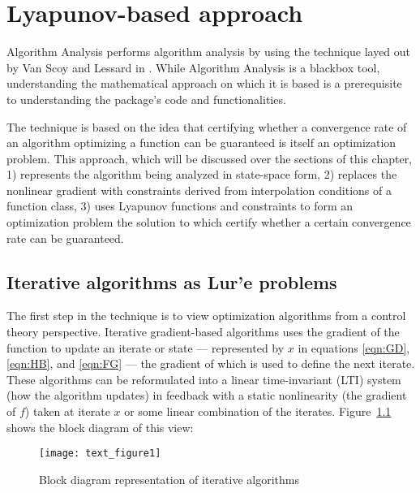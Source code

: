 \chapter{Lyapunov-based approach}\label{chapter:lyapunov}

Algorithm Analysis performs algorithm analysis by using the technique layed out by Van Scoy and Lessard in \cite{tutorial}. While Algorithm Analysis is a blackbox tool, understanding the mathematical approach on which it is based is a prerequisite to understanding the package's code and functionalities.

The technique is based on the idea that certifying whether a convergence rate of an algorithm optimizing a function can be guaranteed is itself an optimization problem. This approach, which will be discussed over the sections of this chapter, 1) represents the algorithm being analyzed in state-space form, 2) replaces the nonlinear gradient with constraints derived from interpolation conditions of a function class, 3) uses Lyapunov functions and constraints to form an optimization problem the solution to which certify whether a certain convergence rate can be guaranteed.
\section{Iterative algorithms as Lur'e problems}

The first step in the technique is to view optimization algorithms from a control theory perspective. Iterative gradient-based algorithms uses the gradient of the function to update an iterate or state --- represented by $x$ in equations \eqref{eqn:GD}, \eqref{eqn:HB}, and \eqref{eqn:FG} --- the gradient of which is used to define the next iterate. These algorithms can be reformulated into a linear time-invariant (LTI) system (how the algorithm updates) in feedback with a static nonlinearity (the gradient of \(f\)) taken at iterate \(x\) or some linear combination of the iterates. Figure~\ref{plot_block_diagram} shows the block diagram of this view:
\begin{figure}[h]
    \centering
	\texttt{[image: text\_figure1]}
    \caption{Block diagram representation of iterative algorithms}
    \label{plot_block_diagram}
\end{figure}

